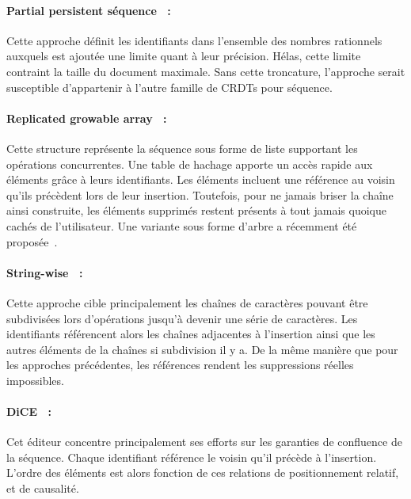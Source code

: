 \paragraph{Partial persistent séquence~\cite{wu2010partial} :} Cette approche
définit les identifiants dans l'ensemble des nombres rationnels auxquels est
ajoutée une limite quant à leur précision. Hélas, cette limite contraint la
taille du document maximale. Sans cette troncature, l'approche serait
susceptible d'appartenir à l'autre famille de CRDTs pour séquence.

\paragraph{Replicated growable array~\cite{roh2011replicated} :} Cette structure
représente la séquence sous forme de liste supportant les opérations
concurrentes. Une table de hachage apporte un accès rapide aux éléments grâce à
leurs identifiants. Les éléments incluent une référence au voisin qu'ils
précèdent lors de leur insertion. Toutefois, pour ne jamais briser la chaîne
ainsi construite, les éléments supprimés restent présents à tout jamais
quoique cachés de l'utilisateur. Une variante sous forme d'arbre a récemment été
proposée~\cite{attiya2016specification}.

\paragraph{String-wise~\cite{yu2012stringwise} :} Cette approche cible
principalement les chaînes de caractères pouvant être subdivisées lors
d'opérations jusqu'à devenir une série de caractères. Les identifiants
référencent alors les chaînes adjacentes à l'insertion ainsi que les autres
éléments de la chaînes si subdivision il y a. De la même manière que pour les
approches précédentes, les références rendent les suppressions réelles
impossibles.

\paragraph{DiCE~\cite{conway2014language} :} Cet éditeur concentre
principalement ses efforts sur les garanties de confluence de la
séquence. Chaque identifiant référence le voisin qu'il précède à
l'insertion. L'ordre des éléments est alors fonction de ces relations de
positionnement relatif, et de causalité.



